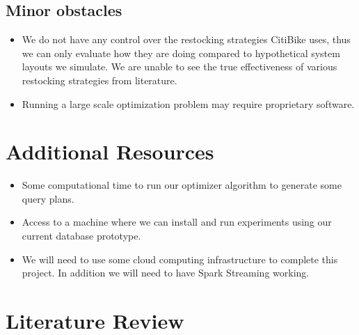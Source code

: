 \documentclass{proc}
\begin{document}
\subsection{Minor obstacles}

\begin{itemize}
 \item We do not have any control over the restocking strategies CitiBike uses, thus we can only evaluate how they are doing compared to hypothetical system layouts we simulate. We are unable to see the true effectiveness of various restocking strategies from literature.
  \item Running a large scale optimization problem may require proprietary software.
\end{itemize}


\section{Additional Resources}

\begin{itemize}
  \item Some computational time to run our optimizer algorithm to generate some query plans.
  \item Access to a machine where we can install and run experiments using our current database prototype.
  \item We will need to use some cloud computing infrastructure to complete this project. In addition we will need to have Spark Streaming working.
 \end{itemize}
 
\section{Literature Review}
\end{document}
